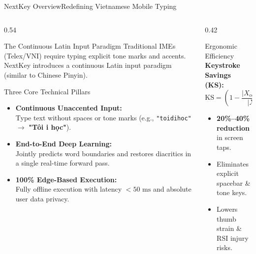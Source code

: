 \documentclass[aspectratio=169,10pt]{beamer}
\begin{document}
\begin{frame}{NextKey Overview}{Redefining Vietnamese Mobile Typing}
  \begin{columns}[T]
    \begin{column}{0.54\textwidth}
      \begin{block}{The Continuous Latin Input Paradigm}
        {\footnotesize Traditional IMEs (Telex/VNI) require typing explicit tone marks and accents. NextKey introduces a continuous Latin input paradigm (similar to Chinese Pinyin).}
      \end{block}
      \begin{exampleblock}{Three Core Technical Pillars}
        \begin{itemize}\setlength{\itemsep}{1.5pt}\footnotesize
          \item \textbf{Continuous Unaccented Input:}\\
            Type text without spaces or tone marks (e.g., \texttt{"toidihoc"} $\to$ \textbf{"T\^oi \dj i h\d{o}c"}).
          \item \textbf{End-to-End Deep Learning:}\\
            Jointly predicts word boundaries and restores diacritics in a single real-time forward pass.
          \item \textbf{100\% Edge-Based Execution:}\\
            Fully offline execution with latency $< 50\text{ ms}$ and absolute user data privacy.
        \end{itemize}
      \end{exampleblock}
    \end{column}

    \begin{column}{0.42\textwidth}
      \begin{block}{Ergonomic Efficiency}
        \textbf{\footnotesize Keystroke Savings (KS):}
        \vspace{-0.1cm}
        \begin{equation*}
          \text{KS} = \left(1 - \frac{|X_{\text{continuous}}|}{|X_{\text{Telex}}|}\right) \times 100\%
        \end{equation*}
        \vspace{-0.1cm}
        \begin{itemize}\setlength{\itemsep}{2pt}\footnotesize
          \item \textbf{20\%--40\% reduction} in screen taps.
          \item Eliminates explicit spacebar \& tone keys.
          \item Lowers thumb strain \& RSI injury risks.
        \end{itemize}
      \end{block}
    \end{column}
  \end{columns}
\end{frame}
\end{document}
